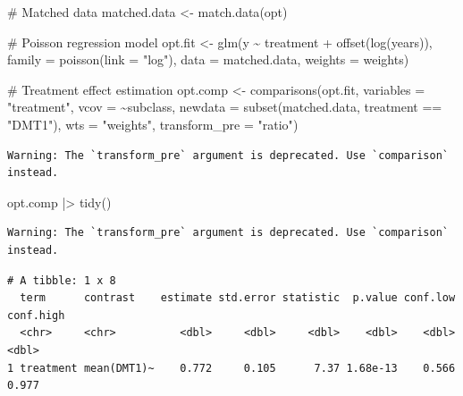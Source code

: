 \documentclass[
  letterpaper,
  DIV=11,
  numbers=noendperiod]{scrreprt}
\newenvironment{Shaded}{\begin{snugshade}}{\end{snugshade}}
\newcommand{\AttributeTok}[1]{\textcolor[rgb]{0.40,0.45,0.13}{#1}}
\newcommand{\CommentTok}[1]{\textcolor[rgb]{0.37,0.37,0.37}{#1}}
\newcommand{\FunctionTok}[1]{\textcolor[rgb]{0.28,0.35,0.67}{#1}}
\newcommand{\NormalTok}[1]{\textcolor[rgb]{0.00,0.23,0.31}{#1}}
\newcommand{\OtherTok}[1]{\textcolor[rgb]{0.00,0.23,0.31}{#1}}
\newcommand{\SpecialCharTok}[1]{\textcolor[rgb]{0.37,0.37,0.37}{#1}}
\newcommand{\StringTok}[1]{\textcolor[rgb]{0.13,0.47,0.30}{#1}}
\begin{document}
\begin{Shaded}
\begin{Highlighting}[]
\CommentTok{\# Matched data}
\NormalTok{matched.data }\OtherTok{\textless{}{-}} \FunctionTok{match.data}\NormalTok{(opt)}

\CommentTok{\# Poisson regression model}
\NormalTok{opt.fit }\OtherTok{\textless{}{-}} \FunctionTok{glm}\NormalTok{(y }\SpecialCharTok{\textasciitilde{}}\NormalTok{ treatment }\SpecialCharTok{+} \FunctionTok{offset}\NormalTok{(}\FunctionTok{log}\NormalTok{(years)), }
            \AttributeTok{family =} \FunctionTok{poisson}\NormalTok{(}\AttributeTok{link =} \StringTok{"log"}\NormalTok{),}
            \AttributeTok{data =}\NormalTok{ matched.data, }
            \AttributeTok{weights =}\NormalTok{ weights)}

\CommentTok{\# Treatment effect estimation}
\NormalTok{opt.comp }\OtherTok{\textless{}{-}} \FunctionTok{comparisons}\NormalTok{(opt.fit,}
                        \AttributeTok{variables =} \StringTok{"treatment"}\NormalTok{,}
                        \AttributeTok{vcov =} \SpecialCharTok{\textasciitilde{}}\NormalTok{subclass,}
                        \AttributeTok{newdata =} \FunctionTok{subset}\NormalTok{(matched.data, treatment }\SpecialCharTok{==} \StringTok{"DMT1"}\NormalTok{),}
                        \AttributeTok{wts =} \StringTok{"weights"}\NormalTok{,}
                        \AttributeTok{transform\_pre =} \StringTok{"ratio"}\NormalTok{)}
\end{Highlighting}
\end{Shaded}

\begin{verbatim}
Warning: The `transform_pre` argument is deprecated. Use `comparison` instead.
\end{verbatim}

\begin{Shaded}
\begin{Highlighting}[]
\NormalTok{opt.comp }\SpecialCharTok{|\textgreater{}} \FunctionTok{tidy}\NormalTok{()}
\end{Highlighting}
\end{Shaded}

\begin{verbatim}
Warning: The `transform_pre` argument is deprecated. Use `comparison` instead.
\end{verbatim}

\begin{verbatim}
# A tibble: 1 x 8
  term      contrast    estimate std.error statistic  p.value conf.low conf.high
  <chr>     <chr>          <dbl>     <dbl>     <dbl>    <dbl>    <dbl>     <dbl>
1 treatment mean(DMT1)~    0.772     0.105      7.37 1.68e-13    0.566     0.977
\end{verbatim}
\end{document}
